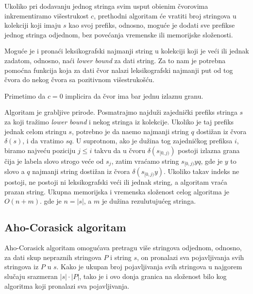 Ukoliko pri dodavanju jednog stringa svim usput obi\dj enim \v cvorovima inkrementiramo vi\v sestrukost $c$, prethodni algoritam \' ce vratiti broj stringova u kolekciji koji imaju $s$ kao svoj prefiks, odnosno, mogu\' ce je dodati sve prefikse jednog stringa odjednom, bez pove\' canja vremenske ili memorijske slo\v zenosti.

Mogu\' ce je i prona\' ci leksikografski najmanji string u kolekciji koji je ve\' ci ili jednak zadatom, odnosno, na\' ci \textit{lower bound} za dati string. Za to nam je potrebna pomo\' cna funkcija koja za dati \v cvor nalazi leksikografski najmanji put od tog \v cvora do nekog \v cvora sa pozitivnom vi\v sestruko\v s\' cu. 



Primetimo da $c=0$ implicira da \v cvor ima bar jednu izlaznu granu.

\noindent
\begin{minipage}[l]{\textwidth}

\end{minipage}

Algoritam je grabljive prirode. Posmatrajmo najdu\v zi zajedni\v cki prefiks stringa $s$ za koji tra\v zimo \textit{lower bound} i nekog stringa iz kolekcije. Ukoliko je taj prefiks jednak celom stringu $s$, potrebno je da na\dj emo najmanji string $q$ dosti\v zan iz \v cvora $\delta(s)$, i da vratimo $sq$. U suprotnom, ako je du\v zina tog zajedni\v ckog prefiksa $i$, biramo najve\' cu poziciju $j \leq i$ takvu da u \v cvoru $\delta(s_{[0, j)})$ postoji izlazna grana \v cija je labela slovo strogo ve\' ce od $s_j$, zatim vra\' camo string $s_{[0,j)}yq$, gde je $y$ to slovo a $q$ najmanji string dosti\v zan iz \v cvora $\delta(s_{[0,j)}y)$. Ukoliko takav indeks ne postoji, ne postoji ni leksikografski ve\' ci ili jednak string, a algoritam vra\' ca prazan string. Ukupna memorijska i vremenska slo\v zenost celog algoritma je $O(n+m)$. gde je $n = |s|$, a $m$ je du\v zina rezulutuju\' ceg stringa.

\subsection{Aho-Corasick algoritam}

Aho-Corasick algoritam omogu\' cava pretragu vi\v se stringova odjednom, odnosno, za dati skup nepraznih stringova $P$ i string $s$, on pronalazi sva pojavljivanja svih stringova iz $P$ u $s$. Kako je ukupan broj pojavljivanja svih stringova u najgorem slu\v caju srazmeran $|s|\cdot|P|$, tako je i ovo donja granica na slo\v zenost bilo kog algoritma koji pronalazi sva pojavljivanja.

